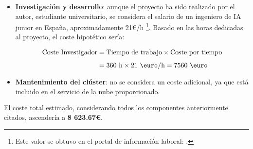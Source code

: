 \begin{itemize}
    \item \textbf{Investigación y desarrollo}: aunque el proyecto ha sido realizado por el autor, estudiante universitario, se considera el salario de un ingeniero de IA junior en España, aproximadamente 21\euro/h%
    \footnote{
        Este valor se obtuvo en el portal de información laboral: \cite{erieri2025ingenieroAI}.
    }. 
    Basado en las horas dedicadas al proyecto, el coste hipotético sería:
    
    \begin{align*}
        \textnormal{Coste Investigador} &= \textnormal{Tiempo de trabajo} \times \textnormal{Coste por tiempo} \\[1ex]
        &= 360\text{ h} \times 21 \text{ \euro/h} = 7 560 \text{ \euro}
    \end{align*}
    
    \item \textbf{Mantenimiento del clúster}: no se considera un coste adicional, ya que está incluido en el servicio de la nube proporcionado.
    
\end{itemize}

El coste total estimado, considerando todos los componentes anteriormente citados, ascendería a \textbf{8 623.67\euro}.

